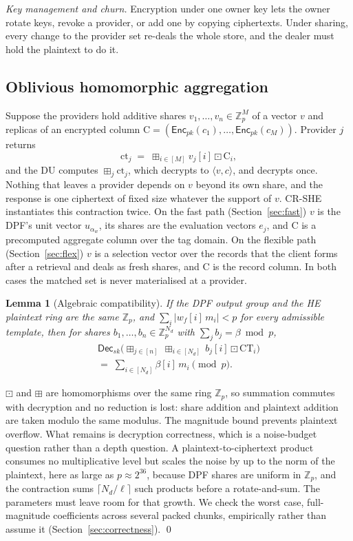 \documentclass[a4paper,fleqn]{cas-sc}
\newtheorem{lemma}{Lemma}
\newcommand{\Dec}{\mathsf{Dec}}
\newcommand{\Enc}{\mathsf{Enc}}
\newcommand{\bplus}{\boxplus}
\newcommand{\bdot}{\boxdot}
\begin{document}
\emph{Key management and churn.} Encryption under one owner key lets the owner
rotate keys, revoke a provider, or add one by copying ciphertexts. Under
sharing, every change to the provider set re-deals the whole store, and the
dealer must hold the plaintext to do it.

\subsection{Oblivious homomorphic aggregation}
\label{sec:oha}
Suppose the providers hold additive shares $v_1,\dots,v_n\in\mathbb{Z}_p^{M}$
of a vector $v$ and replicas of an encrypted column
$\mathrm{C}=(\Enc_{pk}(c_1),\dots,\Enc_{pk}(c_M))$. Provider $j$ returns
\[
\text{ct}_j \;=\; \bplus_{i\in[M]} v_j[i]\bdot \mathrm{C}_i ,
\]
and the DU computes $\bplus_j \text{ct}_j$, which decrypts to
$\langle v,c\rangle$, and decrypts once. Nothing that leaves a provider depends
on $v$ beyond its own share, and the response is one ciphertext of fixed size
whatever the support of $v$. CR-SHE instantiates this contraction twice. On the
fast path (Section~\ref{sec:fast}) $v$ is the DPF's unit vector $u_{\alpha_w}$,
its shares are the evaluation vectors $e_j$, and $\mathrm{C}$ is a precomputed
aggregate column over the tag domain. On the flexible path
(Section~\ref{sec:flex}) $v$ is a selection vector over the records that the
client forms after a retrieval and deals as fresh shares, and $\mathrm{C}$ is
the record column. In both cases the matched set is never materialised at a
provider.

\begin{lemma}[Algebraic compatibility]
\label{lem:compat}
If the DPF output group and the HE plaintext ring are the same $\mathbb{Z}_p$,
and $\sum_{i}|w_f[i]\,m_i| < p$ for every admissible template, then for shares
$b_1,\dots,b_n\in\mathbb{Z}_p^{N_d}$ with $\sum_j b_j = \beta \bmod p$,
\begin{multline*}
\Dec_{sk}\Big(\bplus_{j\in[n]}\ \bplus_{i\in[N_d]}\ b_j[i]\bdot
\text{CT}_i\Big)\\
=\; \sum_{i\in[N_d]} \beta[i]\,m_i \pmod p .
\end{multline*}
\end{lemma}
\begin{pf}
$\bdot$ and $\bplus$ are homomorphisms over the same ring $\mathbb{Z}_p$, so
summation commutes with decryption and no reduction is lost: share addition
and plaintext addition are taken modulo the same modulus. The magnitude bound
prevents plaintext overflow. What remains is decryption correctness, which is
a noise-budget question rather than a depth question. A
plaintext-to-ciphertext product consumes no multiplicative level but scales
the noise by up to the norm of the plaintext, here as large as
$p\approx2^{36}$, because DPF shares are uniform in $\mathbb{Z}_p$, and the
contraction sums $\lceil N_d/\ell\rceil$ such products before a
rotate-and-sum. The parameters must leave room for that growth. We check the
worst case, full-magnitude coefficients across several packed chunks,
empirically rather than assume it (Section~\ref{sec:correctness}). \qed
\end{pf}
\end{document}
